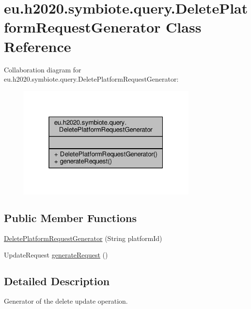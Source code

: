 \hypertarget{classeu_1_1h2020_1_1symbiote_1_1query_1_1DeletePlatformRequestGenerator}{}\section{eu.\+h2020.\+symbiote.\+query.\+Delete\+Platform\+Request\+Generator Class Reference}
\label{classeu_1_1h2020_1_1symbiote_1_1query_1_1DeletePlatformRequestGenerator}


Collaboration diagram for eu.\+h2020.\+symbiote.\+query.\+Delete\+Platform\+Request\+Generator\+:
\nopagebreak
\begin{figure}[H]
\begin{center}
\leavevmode
\includegraphics[width=256pt]{classeu_1_1h2020_1_1symbiote_1_1query_1_1DeletePlatformRequestGenerator__coll__graph}
\end{center}
\end{figure}
\subsection*{Public Member Functions}
\begin{DoxyCompactItemize}
\item 
\hyperlink{classeu_1_1h2020_1_1symbiote_1_1query_1_1DeletePlatformRequestGenerator_afa6c0d89bafb8ddb9e99808f758bf9a7}{Delete\+Platform\+Request\+Generator} (String platform\+Id)
\item 
Update\+Request \hyperlink{classeu_1_1h2020_1_1symbiote_1_1query_1_1DeletePlatformRequestGenerator_a1e17c4d72dd0275e9d87de03fbc5df2c}{generate\+Request} ()
\end{DoxyCompactItemize}


\subsection{Detailed Description}
Generator of the delete update operation.

